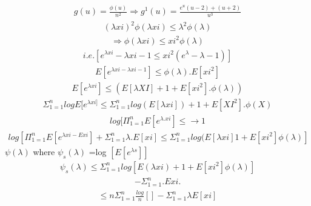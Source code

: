 \documentclass[journal,12pt,twocolumn]{IEEEtran}
\begin{document}
\begin{align}
g(u)=\frac{\phi(u)}{n^2}\Rightarrow g^1(u)=\frac{e^u(u-2)+(u+2)}{u^3}
\end{align}
\begin{align}
(\lambda xi)^2 \phi (\lambda xi)\leqslant \lambda^2 \phi (\lambda)
\end{align}
\begin{align}
\Rightarrow \phi(\lambda xi)\leqslant xi^2 \phi(\lambda)
\end{align}
\begin{align}
i.e. [e^{\lambda xi}-\lambda xi-1 \leqslant xi^2(e^\lambda-\lambda -1)]
\end{align}
\begin{align}
E[e^{\lambda xi -\lambda xi-1}]\leqslant \phi (\lambda).E[xi^2]
\end{align}
\begin{align}
E[e^{\lambda xi}] \leqslant (E[\lambda XI]+1+E[xi^2]. \phi (\lambda))
\end{align}
\begin{align}
\Sigma_{1=1}^{n}log E[e^{\lambda xi]}\leqslant \Sigma_{1=1}^{n} log (E[\lambda xi])+1+E[XI^2]. \phi(X)
\end{align}
\begin{align}
log[\Pi_{1=1}^{n} E[e^{\lambda .xi}] \leqslant \longrightarrow 1
\end{align}
\begin{align}
log[\Pi_{1=1}^{n} E[e^{\lambda xi-E{xi}}]+ \Sigma_{1=1}^{n}\lambda .E[xi] \leqslant \Sigma_{1=1}^{n} log (E[\lambda xi]1+E[xi^2] \phi(\lambda)]
\end{align}
$\psi (\lambda)$ where $\psi_s(\lambda)$ =log $[E[e^{\lambda s}]]$\\
\begin{align}
\psi_s(\lambda) \leqslant \Sigma_{1=1}^{n} log[E({\lambda xi})+1+E[xi^2] \phi(\lambda)]
\end{align}
\begin{align}
- \Sigma_{1=1}^{n}. E{xi}.
\end{align}
\begin{align}
\leqslant n \Sigma_{1=1}^{n} \frac{log}{n} [   ]-\Sigma_{1=1}^{n} \lambda E[xi]
\end{align} 
\end{document}
